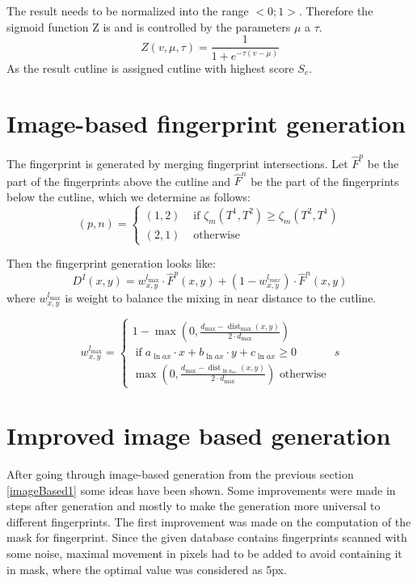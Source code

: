 The result needs to be normalized into the range $<0;1>$. Therefore the sigmoid function Z is and is controlled by the parameters $\mu$ a $\tau$. \cite{morphing_paper}
\begin{equation}
    Z(v, \mu, \tau)=\frac{1}{1+e^{-\tau(v-\mu)}}
\end{equation}
As the result cutline is assigned cutline with highest score $S_c$.\cite{morphing_paper}
 
\label{imageBased1}
\section{Image-based fingerprint generation} \label{picgen}
The fingerprint is generated by merging fingerprint intersections. Let $ \hat{F}^{p} $ be the part of the fingerprints above the cutline and $ \hat{F}^{n} $ be the part of the fingerprints below the cutline, which we determine as follows:
\begin{equation}
    (p, n)=\left\{\begin{array}{ll}
    (1,2) & \text { if } \zeta_{m}\left(T^{1}, T^{2}\right) \geq \zeta_{m}\left(T^{2}, T^{1}\right) \\
    (2,1) & \text { otherwise }
    \end{array}\right.
\end{equation}\cite{morphing_paper}

Then the fingerprint generation looks like: 
\begin{equation}
    D^{I}(x, y)=w_{x, y}^{l_{\max }} \cdot \hat{F}^{p}(x, y)+\left(1-w_{x, y}^{l_{m a x}}\right) \cdot \hat{F}^{n}(x, y)
\end{equation}\cite{morphing_paper}
where $w_{x, y}^{l_{\max }}$ is weight to balance the mixing in near distance to the cutline.\cite{morphing_paper}
    
\begin{equation}
    w_{x, y}^{l_{\max }}=\left\{\begin{array}{c}
    1-\max \left(0, \frac{d_{\max }-\operatorname{dist}_{\max }(x, y)}{2 \cdot d_{\max }}\right) \\
    \operatorname{if} a_{\ln a x} \cdot x+b_{\ln a x} \cdot y+c_{\ln a x} \geq 0 \\
    \max \left(0, \frac{d_{\max }-\operatorname{dist}_{\ln a_{a x}}(x, y)}{2 \cdot d_{\max }}\right) \text { otherwise }
    \end{array}\right.s
\end{equation}

\label{imageBased2}
\section{Improved image based generation}
After going through image-based generation from the previous section \ref{imageBased1} some ideas have been shown. Some improvements were made in steps after generation and mostly to make the generation more universal to different fingerprints. The first improvement was made on the computation of the mask for fingerprint. Since the given database contains fingerprints scanned with some noise, maximal movement in pixels had to be added to avoid containing it in mask, where the optimal value was considered as 5px.

